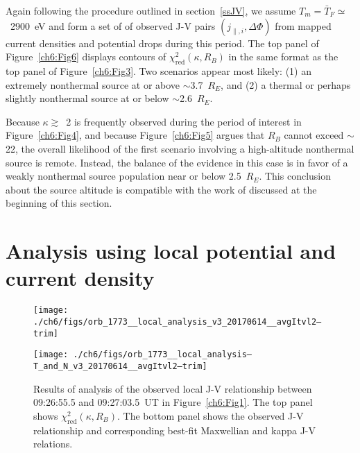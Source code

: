   Again following the procedure outlined in section~\ref{ssJV}, we assume
  $T_m = \bar{T}_F \simeq$~2900~eV and form a set of of observed J-V pairs
  $( j_{\parallel,i} , \Delta \Phi )$ from mapped current densities and
  potential drops during this period. The top panel of Figure~\ref{ch6:Fig6}
  displays contours of $\chi^2_{\textrm{red}} ( \kappa, R_B )$ in the same
  format as the top panel of Figure~\ref{ch6:Fig3}. Two scenarios appear most
  likely: (1) an extremely nonthermal source at or above $\sim$3.7~$R_E$, and
  (2) a thermal or perhaps slightly nonthermal source at or below
  $\sim$2.6~$R_E$.

  Because $\kappa \gtrsim$~2 is frequently observed during the period of
  interest in Figure~\ref{ch6:Fig4}, and because Figure~\ref{ch6:Fig5} argues
  that $R_B$ cannot exceed $\sim$22, the overall likelihood of the first
  scenario involving a high-altitude nonthermal source is remote. Instead, the
  balance of the evidence in this case is in favor of a weakly nonthermal source
  population near or below 2.5~$R_E$. This conclusion about the source altitude
  is compatible with the work of \citet{Ergun1998} discussed at the beginning of
  this section.
  
  \section{Analysis using local potential and current density}


  \begin{figure}
    \centering
    \noindent\texttt{[image: ./ch6/figs/orb\_1773\_\_local\_analysis\_v3\_20170614\_\_avgItvl2--trim]}

    \vspace{1cm}

    \noindent\texttt{[image: ./ch6/figs/orb\_1773\_\_local\_analysis--T\_and\_N\_v3\_20170614\_\_avgItvl2--trim]}

    \caption[Orbit 1773: Reduced chi-squared values for local J-V relationship and
    corresponding best-fit curves.]{Results of analysis of the observed local
      J-V relationship between 09:26:55.5 and 09:27:03.5~UT in
      Figure~\ref{ch6:Fig1}. The top panel shows
      $\chi^2_{\mathrm{red}} ( \kappa, R_B)$. The bottom panel shows the
      observed J-V relationship and corresponding best-fit Maxwellian and kappa
      J-V relations.}
    \label{ch6:Fig7}
  \end{figure}

